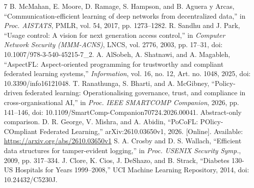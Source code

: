 \documentclass[conference,letterpaper]{IEEEtran}
\begin{document}
\begin{thebibliography}{7}
 B. McMahan, E. Moore, D. Ramage, S. Hampson, and B. Aguera y Arcas, ``Communication-efficient learning of deep networks from decentralized data,'' in \emph{Proc. AISTATS}, PMLR, vol. 54, 2017, pp. 1273--1282.
 R. Sandhu and J. Park, ``Usage control: A vision for next generation access control,'' in \emph{Computer Network Security (MMM-ACNS)}, LNCS, vol. 2776, 2003, pp. 17--31, doi: 10.1007/978-3-540-45215-7\_2.
 A. AlSobeh, A. Shatnawi, and A. Magableh, ``AspectFL: Aspect-oriented programming for trustworthy and compliant federated learning systems,'' \emph{Information}, vol. 16, no. 12, Art. no. 1048, 2025, doi: 10.3390/info16121048.
 T. Ranathunga, S. Bharti, and A. McGibney, ``Policy-driven federated learning: Operationalising governance, trust, and compliance in cross-organisational AI,'' in \emph{Proc. IEEE SMARTCOMP Companion}, 2026, pp. 141--146, doi: 10.1109/SmartComp-Companion70724.2026.00041. Abstract-only comparison.
 D. R. George, V. Mishra, and A. Abidin, ``PoCoFL: POlicy-COmpliant Federated Learning,'' arXiv:2610.03650v1, 2026. [Online]. Available: \url{https://arxiv.org/abs/2610.03650v1}
 S. A. Crosby and D. S. Wallach, ``Efficient data structures for tamper-evident logging,'' in \emph{Proc. USENIX Security Symp.}, 2009, pp. 317--334.
 J. Clore, K. Cios, J. DeShazo, and B. Strack, ``Diabetes 130-US Hospitals for Years 1999--2008,'' UCI Machine Learning Repository, 2014, doi: 10.24432/C5230J.
\end{thebibliography}
\smallskip
\end{document}

